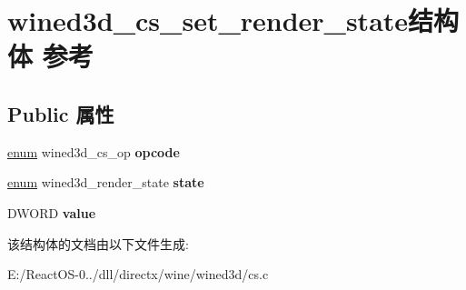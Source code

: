 \hypertarget{structwined3d__cs__set__render__state}{}\section{wined3d\+\_\+cs\+\_\+set\+\_\+render\+\_\+state结构体 参考}
\label{structwined3d__cs__set__render__state}
\subsection*{Public 属性}
\begin{DoxyCompactItemize}
\item 
\mbox{\label{structwined3d__cs__set__render__state_a95ffe863ef68bd849494486a759f25ed}} 
\hyperlink{interfaceenum}{enum} wined3d\+\_\+cs\+\_\+op {\bfseries opcode}
\item 
\mbox{\label{structwined3d__cs__set__render__state_a7424afe6e779bafabdb7d5f4e69c7ad0}} 
\hyperlink{interfaceenum}{enum} wined3d\+\_\+render\+\_\+state {\bfseries state}
\item 
\mbox{\label{structwined3d__cs__set__render__state_ad34a3a99d74883b95abf79deafd053ab}} 
D\+W\+O\+RD {\bfseries value}
\end{DoxyCompactItemize}


该结构体的文档由以下文件生成\+:\begin{DoxyCompactItemize}
\item 
E\+:/\+React\+O\+S-\/0../dll/directx/wine/wined3d/cs.\+c\end{DoxyCompactItemize}
